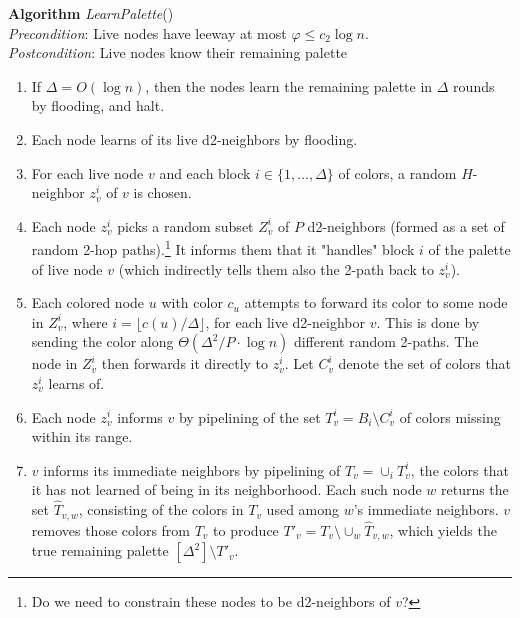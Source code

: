 \bigskip

   \textbf{Algorithm} \emph{LearnPalette}() \\
    \emph{Precondition}: Live nodes have leeway at most $\varphi \le c_2\log n$. \\
  \emph{Postcondition}: Live nodes know their remaining palette

\begin{enumerate}
  \item If $\Delta = O(\log n)$, then the nodes learn the remaining palette in $\Delta$ rounds by flooding, and halt.
  \item Each node learns of its live d2-neighbors by flooding.
  \item For each live node $v$ and each block $i \in \{1,\ldots, \Delta\}$ of colors, a random $H$-neighbor $z^i_v$ of $v$ is chosen.
  \item Each node $z^i_v$ picks a random subset $Z_v^i$ of $P$ d2-neighbors (formed as a set of random 2-hop paths).\footnote{Do we need to constrain these nodes to be d2-neighbors of $v$?}
  It informs them that it "handles" block $i$ of the palette of live node $v$ (which indirectly tells them also the 2-path back to $z^i_v$). 
  \item Each colored node $u$ with color $c_u$ attempts to forward its color to some node in $Z_v^i$, where $i = \lfloor c(u) / \Delta \rfloor$, for each live d2-neighbor $v$. 
  This is done by sending the color along $\Theta(\Delta^2/P \cdot \log n)$ different random 2-paths. The node in $Z_v^i$ then forwards it directly to $z^i_v$. Let $C^i_v$ denote the set of colors that $z^i_v$ learns of.
  \item Each node $z_v^i$ informs $v$ by pipelining of the set $T_v^i = B_i \setminus C_v^i$ of colors missing within its range. 
  \item $v$ informs its immediate neighbors by pipelining of $T_v= \cup_i T_v^i$, the colors that it has not learned of being in its neighborhood. Each such node $w$ returns the set $\hat{T}_{v,w}$, consisting of the colors in $T_v$ used among $w$'s immediate neighbors. $v$ removes those colors from $T_v$ to produce $T'_v = T_v \setminus \cup_w \hat{T}_{v,w}$, which yields the true remaining palette $[\Delta^2] \setminus T'_{v}$.
\end{enumerate}
 \medskip
 
